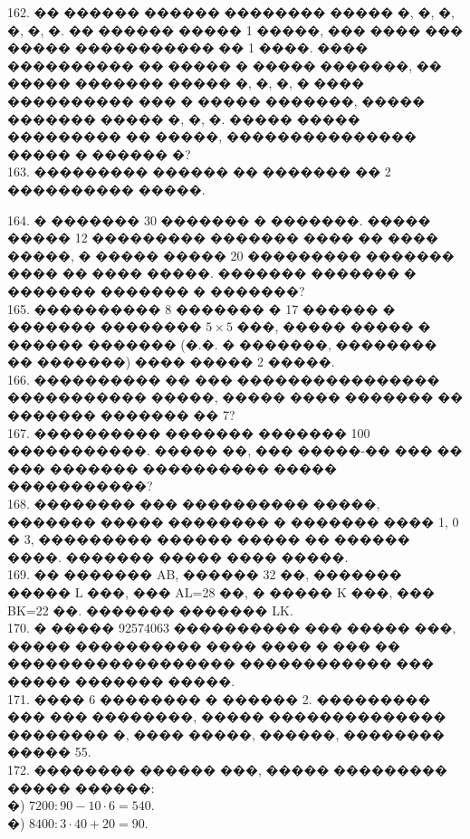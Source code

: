 \documentclass[12pt]{article}
\begin{document}
\begin{center}
\begin{figure}[ht!]
\end{figure}
\end{center}
162. �� ������ ������ �������� ����� �, �, �, �, �, �. �� ������ ����� 1 �����, ��� ���� ��� ����� ����������� �� 1 ����. ���� ���������� �� ����� � ����� �������, �� ����� ������� ����� �, �, �, � ���� ���������� ��� � ����� �������, ����� ������� ����� �, �, �. ����� ����� ��������� �� �����, ��������������� ����� � ������ �?\\
163. ��������� ������ �� ������� �� 2 ���������� �����.
\begin{center}
\begin{figure}[ht!]
\end{figure}
\end{center}
164. � ������� 30 ������� � �������. ����� ����� 12 ��������� ������� ���� �� ���� �����, � ����� ����� 20 ��������� ������� ���� �� ���� �����. ������� ������� � ������� ������� � �������?\\
165. ���������� 8 ������� � 17 ������ � ������� �������� $5\times5$ ���, ����� ����� � ������ ������� (�.�. � �������, �������� �� �������) ���� ����� 2 �����.\\
166. ���������� �� ��� ���������������� ����������� �����, ����� ���� ������� �� ������� ������� �� 7?\\
167. ���������� ������� ������� 100 �����������. ����� ��, ��� �����-�� ��� �� ��� ������� ���������� ����� �����������?\\
168. �������� ��� ���������� �����, ������� ����� �������� � ������� ���� 1, 0 � 3, ��������� ������ ����� �� ������ ����. ������� ����� ���� �����.\\
169. �� ������� AB, ������ 32 ��, ������� ����� L ���, ��� AL=28 ��, � ����� K ���, ��� BK=22 ��. ������� ������� LK.\\
170. � ����� 92574063 ���������� ��� ����� ���, ����� ���������� ���� ���� � ��� �� ������������������ ������������ ��� ����� ������� �����.\\
171. ���� 6 �������� � ������ 2. ��������� ��� ��� ��������, ����� �������������� �������� �, ���� �����, ������, �������� ����� 55.\\
172. �������� ������ ���, ����� ��������� ����� ������:\\
�) $7200:90-10\cdot6=540.$\\
�) $8400:3\cdot40+20=90.$\\
\end{document}
